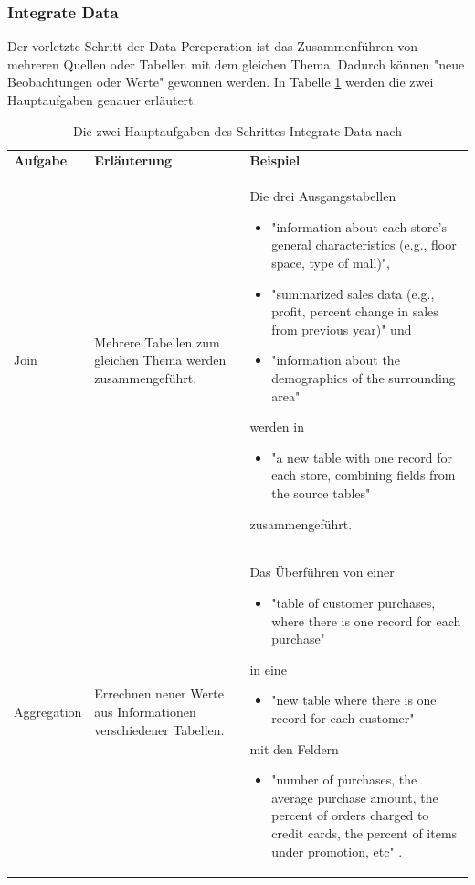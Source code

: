 \subsubsection{Integrate Data}
Der vorletzte Schritt der Data Pereperation ist das Zusammenführen von mehreren Quellen oder Tabellen mit dem gleichen Thema. Dadurch können "neue Beobachtungen oder Werte" \citep[S.~22]{chapman_crisp-dm_2000} gewonnen werden. In Tabelle \ref{tab:integrateDataO} werden die zwei Hauptaufgaben \citep[S.~17]{shearer_crisp-dm_2000} genauer erläutert.
\begin{table}[H] \centering
\begin{tabular}{|p{2cm}|p{3.5cm}|p{10cm}|}
\hline
\textbf{Aufgabe} & \textbf{Erläuterung} & \textbf{Beispiel}\\
\hhline{===}
Join & Mehrere Tabellen zum gleichen Thema werden zusammengeführt. & Die drei Ausgangstabellen
\begin{itemize}
\item "information about each store’s general characteristics (e.g., floor space, type of mall)",
\item "summarized sales data (e.g., profit, percent change in sales from previous year)" und
\item "information about the demographics of the surrounding area"
\end{itemize}
werden in 
\begin{itemize}
\item "a new table with one record for each store, combining fields from the source tables" \citep[S.~16]{shearer_crisp-dm_2000}
\end{itemize}
zusammengeführt. \\ \hline
Aggregation &  Errechnen neuer Werte aus Informationen verschiedener Tabellen. & Das Überführen von einer
\begin{itemize}
\item "table of customer purchases, where there is one record for each purchase"
\end{itemize}
in eine 
\begin{itemize}
\item "new table where there is one record for each customer"
\end{itemize}
mit den Feldern 
\begin{itemize}
\item "number of purchases, the average purchase amount, the percent of orders charged to credit cards, the
percent of items under promotion, etc" \citep[S.~17]{shearer_crisp-dm_2000}.
\end{itemize}
\\
   \hline
\end{tabular}
\caption{Die zwei Hauptaufgaben des Schrittes Integrate Data nach \citep[S.~17]{shearer_crisp-dm_2000}}
\label{tab:integrateDataO}
\end{table}

